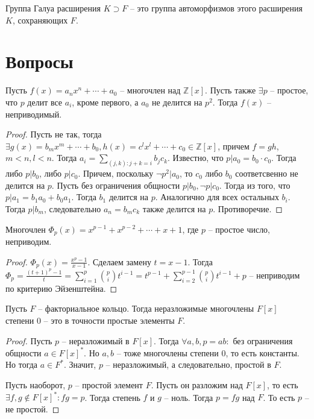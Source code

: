 \documentclass{article}
\begin{document}
\begin{definition}
    Группа Галуа расширения $K \supset F$ -- это группа автоморфизмов этого расширения $K$, сохраняющих $F$.
\end{definition}

\section{Вопросы}
\begin{statement}
    Пусть $f(x) = a_n x^n + \cdots + a_0$ -- многочлен над $\mathbb{Z}[x]$. Пусть также $\exists p$ -- простое,
    что $p$ делит все $a_i$, кроме первого, а $a_0$ не делится на $p^2$. Тогда $f(x)$ -- неприводимый.
\end{statement}

\begin{proof}
    Пусть не так, тогда $\exists g(x) = b_m x^m + \cdots + b_0, h(x) = c^l x^l + \cdots + c_0 \in \mathbb{Z}[x]$, причем
    $f = gh$, $m < n, l < n$. Тогда $a_i = \sum_{(j, k): j + k = i} b_j c_k$. Известно, что $p | a_0 = b_0 \cdot c_0$.
    Тогда либо $p | b_0$, либо $p | c_0$. Причем, поскольку $\neg p^2 | a_0$, то $c_0$ либо $b_0$ соответсвенно не
    делится на $p$. Пусть без ограничения общности $p | b_0, \neg p | c_0$. Тогда из того, что $p | a_1 = b_1 a_0 + b_0
    a_1$. Тогда $b_1$ делится на $p$. Аналогично для всех остальных $b_i$. Тогда $p | b_m$, следовательно $a_n = b_m
    c_k$ также делится на $p$. Противоречие.
\end{proof}

\begin{statement}
    Многочлен $\Phi_p(x) = x^{p - 1} + x^{p - 2} + \cdots + x + 1$, где $p$ -- простое число, неприводим.
\end{statement}

\begin{proof}
    $\Phi_p(x) = \frac{x^p - 1}{x - 1}$. Сделаем замену $t = x - 1$. Тогда $\Phi_p = \frac{(t + 1)^p - 1}{t} = \sum_{i =
    1}^p \binom{p}{i} t^{i - 1} = t^{p - 1} + \sum_{i = 2}^{p - 1} \binom{p}{i} t^{i - 1} + p$ -- неприводим по критерию
    Эйзенштейна.
\end{proof}

\begin{statement}
    Пусть $F$ -- факториальное кольцо. Тогда неразложимые многочлены $F[x]$ степени 0 -- это в точности простые элементы
    $F$.
\end{statement}

\begin{proof}
    Пусть $p$ -- неразложимый в $F[x]$. Тогда $\forall a, b, p = ab:$ без ограничения общности $a \in F[x]^*$. Но $a, b$
    -- тоже многочлены степени 0, то есть константы. Но тогда $a \in F^*$. Значит, $p$ -- неразложимый, а следовательно,
    простой в $F$.

    Пусть наоборот, $p$ -- простой элемент $F$. Пусть он разложим над $F[x]$, то есть $\exists f, g \not \in F[x]^*: fg
    = p$. Тогда степень $f$ и $g$ -- ноль. Тогда $p = fg$ над $F$. То есть $p$ -- не простой.
\end{proof}
\end{document}

